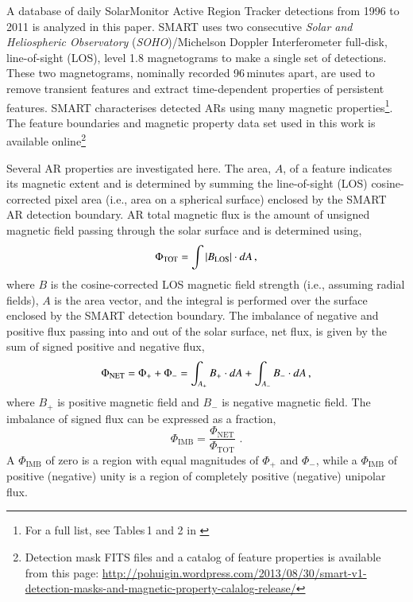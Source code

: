 \documentclass[namedreferences]{solarphysics}
\begin{document}
\begin{article}
A database of daily SolarMonitor Active Region Tracker \citep[SMART;][]{higgins:2011} detections from 1996 to 2011 is analyzed in this paper. SMART uses two consecutive \emph{Solar and Heliospheric Observatory} (\emph{SOHO})/Michelson Doppler Interferometer \citep[MDI;][]{Scherrer:1995} full-disk, line-of-sight (LOS), level 1.8 magnetograms to make a single set of detections. These two magnetograms, nominally recorded 96\,minutes apart, are used to remove transient features and extract time-dependent properties of persistent features. SMART characterises detected ARs using many magnetic properties\footnote{For a full list, see Tables\,1 and 2 in \cite{higgins:2011}}. The feature boundaries and magnetic property data set used in this work is available online\footnote{Detection mask FITS files and a catalog of feature properties is available from this page: \url{http://pohuigin.wordpress.com/2013/08/30/smart-v1-detection-masks-and-magnetic-property-calalog-release/}}

Several AR properties are investigated here. The area, $A$, of a feature indicates its magnetic extent and is determined by summing the line-of-sight (LOS) cosine-corrected pixel area (i.e., area on a spherical surface) enclosed by the SMART AR detection boundary. 
AR total magnetic flux is the amount of unsigned magnetic field passing through the solar surface and is determined using,
\begin{equation}\label{eqn:flux}
\Phi_{\mathrm{TOT}}=\int{|{B_{\mathrm{LOS}}}|\cdot d{A}} \mbox{\,,}
\end{equation}
where ${B}$ is the cosine-corrected LOS magnetic field strength (i.e., assuming radial fields), ${A}$ is the area vector, and the integral is performed over the surface enclosed by the SMART detection boundary. The imbalance of negative and positive flux passing into and out of the solar surface, net flux, is given by the sum of signed positive and negative flux,
\begin{equation}
\Phi_{\mathrm{NET}}=\Phi_{+}+\Phi_{-}=\int_{A_+}{{B_{+}}\cdot d{A}} + \int_{A_-}{B_{-}\cdot dA} \mbox{\,,}
\end{equation}
where ${B_{+}}$ is positive magnetic field and ${B_{-}}$ is negative magnetic field.
The imbalance of signed flux can be expressed as a fraction,
\begin{equation}
\Phi_{\mathrm{IMB}} = \frac{\Phi_{\mathrm{NET}}}{\Phi_{\mathrm{TOT}}} \mbox{\ .}
\end{equation}
A $\Phi_{\mathrm{IMB}}$ of zero is a region with equal magnitudes of $\Phi_{+}$ and $\Phi_{-}$, while a $\Phi_{\mathrm{IMB}}$ of positive (negative) unity is a region of completely positive (negative) unipolar flux. %



\end{article}
\end{document}
